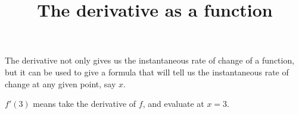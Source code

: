 \documentclass{ximera}
\title[Dig-in:]{The derivative as a function}
\begin{document}
\begin{abstract}
\end{abstract}
\maketitle

The derivative not only gives us the instantaneous rate of change of a
function, but it can be used to give a formula that will tell us the
instantaneous rate of change at any given point, say $x$.



\begin{defintion}
  $f'(3)$ means take the derivative of $f$, and evaluate at $x=3$.
\end{defintion}
\end{document}
